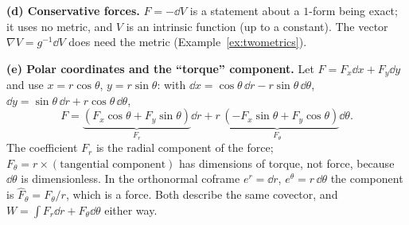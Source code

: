 \textbf{(d) Conservative forces.} $F=-\dd V$ is a statement about a $1$-form being exact; it uses no metric, and $V$ is an intrinsic function (up to a constant). The vector $\nabla V=g^{-1}\dd V$ does need the metric (Example~\ref{ex:twometrics}).

\textbf{(e) Polar coordinates and the ``torque'' component.} Let $F=F_x\dd x+F_y\dd y$ and use $x=r\cos\theta$, $y=r\sin\theta$: with $\dd x=\cos\theta\,\dd r-r\sin\theta\,\dd\theta$, $\dd y=\sin\theta\,\dd r+r\cos\theta\,\dd\theta$,
\[
F=\underbrace{(F_x\cos\theta+F_y\sin\theta)}_{F_r}\dd r+\underbrace{r\,(-F_x\sin\theta+F_y\cos\theta)}_{F_\theta}\dd\theta .
\]
The coefficient $F_r$ is the radial component of the force; $F_\theta=r\times(\text{tangential component})$ has dimensions of torque, not force, because $\dd\theta$ is dimensionless. In the orthonormal coframe $e^r=\dd r$, $e^\theta=r\,\dd\theta$ the component is $\hat F_\theta=F_\theta/r$, which is a force. Both describe the same covector, and $W=\int F_r\dd r+F_\theta\dd\theta$ either way.
